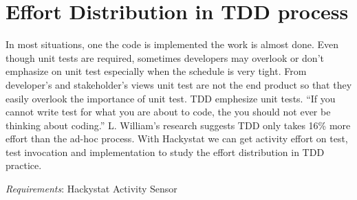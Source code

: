 


\section{Effort Distribution in TDD process}
In most situations, one the code is implemented the work is almost
done. Even though unit tests are required, sometimes developers may
overlook or don't emphasize on unit test especially when the schedule is
very tight\cite{Maximilien_2003}. From developer's and stakeholder's views
unit test are not the end product so that they easily overlook the
importance of unit test. TDD emphesize unit tests. ``If you cannot write
test for what you are about to code, the you should not ever be thinking
about coding.'' L. William's research suggests TDD only takes 16\%  more
effort than the ad-hoc process. With Hackystat we can get activity effort
on test, test invocation and implementation to study the effort
distribution in TDD practice.

\begin{description}
\item\emph{Requirements}: Hackystat Activity Sensor
\end{description}




